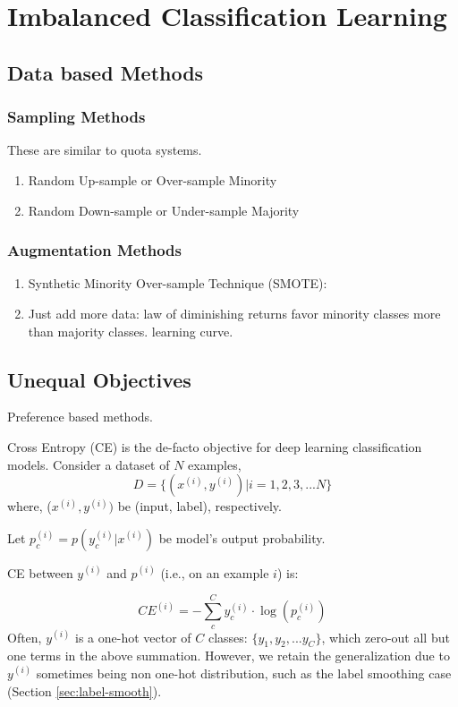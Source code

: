 \chapter{Imbalanced Classification Learning}
\label{ch:imb-learning}


\section{Data based Methods}
\subsection{Sampling Methods}
These are similar to quota systems. 
\begin{enumerate}
    \item Random Up-sample or Over-sample Minority
    \item Random Down-sample or Under-sample Majority
\end{enumerate}


\subsection{Augmentation Methods}

\begin{enumerate}
 \item Synthetic Minority Over-sample Technique (SMOTE): \citet{chawla2002smote}
 \item Just add more data: law of diminishing returns favor minority classes more than majority classes. \citet{koehn2017sixchallenges} learning curve.
\end{enumerate}


\section{Unequal Objectives}
Preference based methods.

Cross Entropy (CE) is the de-facto objective for deep learning classification models.
Consider a dataset of $N$ examples, $$ D = \{(x^{(i)}, y^{(i)}) | i = 1, 2, 3, ... N\}$$
where, ($x^{(i)}, y^{(i)})$ be (input, label), respectively.

Let $p^(i)_c=p(y^{(i)}_c|x^{(i)})$ be model's output probability.

CE between $y^{(i)}$ and $p^{(i)}$ (i.e., on an example $i$) is:

\begin{equation}
 CE^{(i)} = -\sum^C_{c} y^{(i)}_c\cdot \log(p^{(i)}_c)
\end{equation}
Often, $y^{(i)}$ is a one-hot vector of $C$ classes: $\{y_1, y_2, ... y_C\}$, which zero-out all but one terms in the above summation. However, we retain the generalization due to $y^{(i)}$ sometimes being non one-hot distribution, such as the label smoothing case (Section \ref{sec:label-smooth}).

